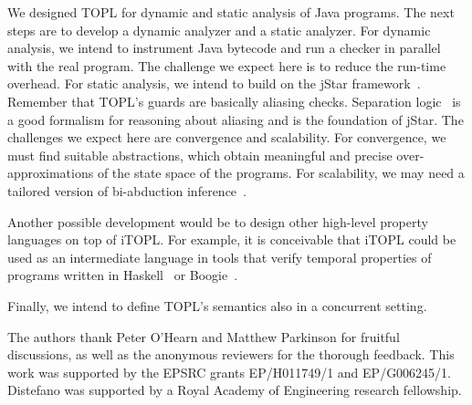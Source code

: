 \documentclass{sigplanconf} %
\theoremstyle{definition}
\theoremstyle{remark}
\begin{document}
We designed TOPL for dynamic and static analysis of Java programs.
The next steps are to develop a dynamic analyzer and a static analyzer.
For dynamic analysis, we intend to instrument Java bytecode and run a checker in parallel with the real program.
The challenge we expect here is to reduce the run-time overhead.
For static analysis, we intend to build on the jStar framework~\cite{DBLP:conf/oopsla/DistefanoP08}.
Remember that TOPL's guards are basically aliasing checks.
Separation logic~\cite{reynolds2002} is a good formalism for reasoning about aliasing and is the foundation of jStar.
The challenges we expect here are convergence and scalability.
For convergence, we must find suitable abstractions, which obtain meaningful and precise over-approximations of the state space of the programs.
For scalability, we may need a tailored version of bi-abduction inference~\cite{dblp:conf/popl/CalcagnoDOY09}.

Another possible development would be to design other high-level property languages on top of iTOPL\null.
For example, it is conceivable that iTOPL could be used as an intermediate language in tools that verify temporal properties of programs written in Haskell~\cite{haskell} or Boogie~\cite{leino2008boogie}.

Finally, we intend to define TOPL's semantics also in a concurrent setting.

\acks

The authors thank Peter O'Hearn and Matthew Parkinson for fruitful discussions, as well as  
the anonymous reviewers for the thorough feedback.
This work was supported by the EPSRC grants EP/H011749/1 and EP/G006245/1.
Distefano was supported by a Royal Academy of Engineering research fellowship.

\softraggedright


\end{document}
